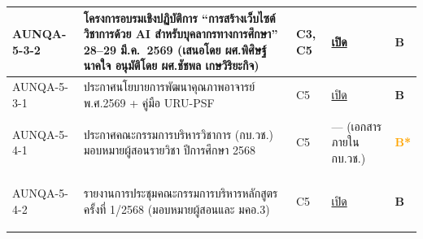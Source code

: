 \begin{longtable}{|>{\raggedright\arraybackslash}p{2.3cm}|>{\raggedright\arraybackslash}p{6.5cm}|>{\centering\arraybackslash}p{1.1cm}|>{\raggedright\arraybackslash}p{3.4cm}|>{\centering\arraybackslash}p{0.8cm}|}
  \hypertarget{ref:AUNQA-5-3-2}{AUNQA-5-3-2} & โครงการอบรมเชิงปฏิบัติการ ``การสร้างเว็บไซต์วิชาการด้วย AI สำหรับบุคลากรทางการศึกษา'' 28--29 มี.ค.~2569 (เสนอโดย ผศ.พิศิษฐ์ นาคใจ อนุมัติโดย ผศ.ชัชพล เกษวิริยะกิจ) & C3, C5 & \href{https://syweb.kidcbc.work/Eviden_aunqa68/\%E0\%B8\%AB\%E0\%B8\%A5\%E0\%B8\%B1\%E0\%B8\%81\%E0\%B8\%90\%E0\%B8\%B2\%E0\%B8\%99\%E0\%B8\%81\%E0\%B8\%B2\%E0\%B8\%A3\%E0\%B8\%9B\%E0\%B8\%A3\%E0\%B8\%B0\%E0\%B8\%8A\%E0\%B8\%B8\%E0\%B8\%A1/01_\%E0\%B8\%A3\%E0\%B8\%B0\%E0\%B8\%94\%E0\%B8\%B1\%E0\%B8\%9A\%E0\%B8\%AB\%E0\%B8\%A5\%E0\%B8\%B1\%E0\%B8\%81\%E0\%B8\%AA\%E0\%B8\%B9\%E0\%B8\%95\%E0\%B8\%A3/AUNQA-5-3-2_\%E0\%B9\%82\%E0\%B8\%84\%E0\%B8\%A3\%E0\%B8\%87\%E0\%B8\%81\%E0\%B8\%B2\%E0\%B8\%A3\%E0\%B8\%AD\%E0\%B8\%9A\%E0\%B8\%A3\%E0\%B8\%A1_AI_\%E0\%B9\%80\%E0\%B8\%A7\%E0\%B9\%87\%E0\%B8\%9A\%E0\%B8\%A7\%E0\%B8\%B4\%E0\%B8\%8A\%E0\%B8\%B2\%E0\%B8\%81\%E0\%B8\%B2\%E0\%B8\%A3_2569-03-28.pdf}{เปิด} & \textcolor{blue!70!black}{\textbf{B}} \\
  \hline
  \hypertarget{ref:AUNQA-5-3-1}{AUNQA-5-3-1} & ประกาศนโยบายการพัฒนาคุณภาพอาจารย์ พ.ศ.2569 + คู่มือ URU-PSF & C5 & \href{https://syweb.kidcbc.work/Eviden_aunqa68/\%E0\%B8\%AB\%E0\%B8\%A5\%E0\%B8\%B1\%E0\%B8\%81\%E0\%B8\%90\%E0\%B8\%B2\%E0\%B8\%99\%E0\%B8\%81\%E0\%B8\%B2\%E0\%B8\%A3\%E0\%B8\%9B\%E0\%B8\%A3\%E0\%B8\%B0\%E0\%B8\%8A\%E0\%B8\%B8\%E0\%B8\%A1/01_\%E0\%B8\%A3\%E0\%B8\%B0\%E0\%B8\%94\%E0\%B8\%B1\%E0\%B8\%9A\%E0\%B8\%AB\%E0\%B8\%A5\%E0\%B8\%B1\%E0\%B8\%81\%E0\%B8\%AA\%E0\%B8\%B9\%E0\%B8\%95\%E0\%B8\%A3/\%E0\%B8\%81\%E0\%B8\%A1\%E0\%B8\%A8_2569-01-07_\%E0\%B8\%97\%E0\%B8\%9A\%E0\%B8\%97\%E0\%B8\%A7\%E0\%B8\%99\%E0\%B8\%AB\%E0\%B8\%A5\%E0\%B8\%B1\%E0\%B8\%81\%E0\%B8\%AA\%E0\%B8\%B9\%E0\%B8\%95\%E0\%B8\%A3.pdf}{เปิด} & \textcolor{blue!70!black}{\textbf{B}} \\
  \hline
  \hypertarget{ref:AUNQA-5-4-1}{AUNQA-5-4-1} & ประกาศคณะกรรมการบริหารวิชาการ (กบ.วช.) มอบหมายผู้สอนรายวิชา ปีการศึกษา 2568 & C5 & --- (เอกสารภายใน กบ.วช.) & \textcolor{orange}{\textbf{B*}} \\
  \hline
  \hypertarget{ref:AUNQA-5-4-2}{AUNQA-5-4-2} & รายงานการประชุมคณะกรรมการบริหารหลักสูตร ครั้งที่ 1/2568 (มอบหมายผู้สอนและ มคอ.3) & C5 & \href{https://syweb.kidcbc.work/Eviden_aunqa68/\%E0\%B8\%A3\%E0\%B8\%B0\%E0\%B9\%80\%E0\%B8\%9A\%E0\%B8\%B5\%E0\%B8\%A2\%E0\%B8\%9A\%E0\%B8\%82\%E0\%B9\%89\%E0\%B8\%AD\%E0\%B8\%9A\%E0\%B8\%B1\%E0\%B8\%87\%E0\%B8\%84\%E0\%B8\%B1\%E0\%B8\%9A\%E0\%B9\%81\%E0\%B8\%A5\%E0\%B8\%B0\%E0\%B8\%9B\%E0\%B8\%A3\%E0\%B8\%B0\%E0\%B8\%81\%E0\%B8\%B2\%E0\%B8\%A8\%E0\%B8\%AD\%E0\%B8\%B7\%E0\%B9\%88\%E0\%B8\%99\%E0\%B9\%86/AUNQA-1-1_\%E0\%B8\%A1\%E0\%B8\%84\%E0\%B8\%AD2_\%E0\%B8\%9C\%E0\%B9\%88\%E0\%B8\%B2\%E0\%B8\%99\%E0\%B8\%AA\%E0\%B8\%A0\%E0\%B8\%B2_2568.pdf}{เปิด} & \textcolor{blue!70!black}{\textbf{B}} \\

\end{longtable}
